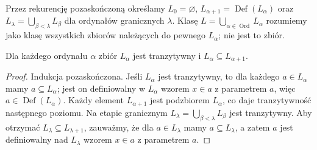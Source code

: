 \begin{definicja}[Hierarchia $L$]\label{def:l-hierarchy}
Przez rekurencję pozaskończoną określamy $L_0=\varnothing$, $L_{\alpha+1}=\operatorname{Def}(L_\alpha)$ oraz $L_\lambda=\bigcup_{\beta<\lambda}L_\beta$ dla ordynałów granicznych $\lambda$. Klasę $L=\bigcup_{\alpha\in\operatorname{Ord}}L_\alpha$ rozumiemy jako klasę wszystkich zbiorów należących do pewnego $L_\alpha$; nie jest to zbiór.
\end{definicja}
\begin{lemat}\label{lem:l-transitive}
Dla każdego ordynału $\alpha$ zbiór $L_\alpha$ jest tranzytywny i $L_\alpha\subseteq L_{\alpha+1}$.
\end{lemat}
\begin{proof}
Indukcja pozaskończona. Jeśli $L_\alpha$ jest tranzytywny, to dla każdego $a\in L_\alpha$ mamy $a\subseteq L_\alpha$; jest on definiowalny w $L_\alpha$ wzorem $x\in a$ z parametrem $a$, więc $a\in\operatorname{Def}(L_\alpha)$. Każdy element $L_{\alpha+1}$ jest podzbiorem $L_\alpha$, co daje tranzytywność następnego poziomu. Na etapie granicznym $L_\lambda=\bigcup_{\beta<\lambda}L_\beta$ jest tranzytywny. Aby otrzymać $L_\lambda\subseteq L_{\lambda+1}$, zauważmy, że dla $a\in L_\lambda$ mamy $a\subseteq L_\lambda$, a zatem $a$ jest definiowalny nad $L_\lambda$ wzorem $x\in a$ z parametrem $a$.
\end{proof}
